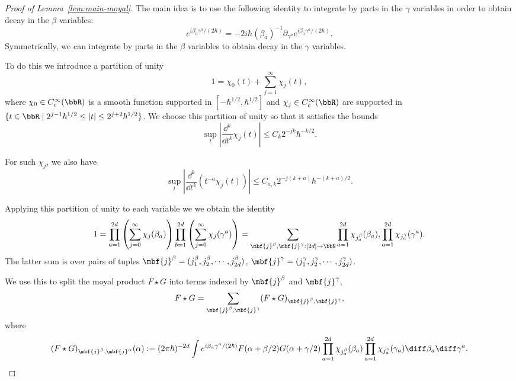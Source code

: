 \documentclass{article}
\numberwithin{equation}{section}
\begin{document}
\begin{proof}[Proof of Lemma~\ref{lem:main-moyal}]
	The main idea is to use the following identity to integrate by parts in the
	$\gamma$ variables in order to obtain decay in the $\beta$ variables:
	\begin{equation}
		\label{eq:int-by-pts}
		e^{i\beta_a\gamma^a/(2\hbar)} =
		-2i\hbar (\beta_a)^{-1} \partial_{\gamma^a} e^{i\beta_a\gamma^a/(2\hbar)}.
	\end{equation}
	Symmetrically, we can integrate by parts in the $\beta$ variables to obtain decay in
	the $\gamma$ variables.
	
	To do this we introduce a partition of unity
	\[
	1 = \chi_0(t) + \sum_{j=1}^\infty \chi_j(t),
	\]
	where $\chi_0\in C_c^\infty(\bbR)$ is a smooth function supported in $[-\hbar^{1/2},\hbar^{1/2}]$
	and $\chi_j\in C_c^\infty(\bbR)$ are supported in $\{t\in\bbR \mid
	2^{j-1}\hbar^{1/2} \leq |t| \leq 2^{j+2} \hbar^{1/2}\}$.  We choose this partition of unity so that it satisfies the bounds
	\begin{equation}
		\label{eq:chi-grad-bds}
		\sup_t \left|\frac{\dd^k}{\dd t^k} \chi_j(t) \right| \leq C_k 2^{-jk} \hbar^{-k/2}.
	\end{equation}
	
	For such $\chi_j$, we also have
	\begin{equation}
		\label{eq:chi-t-bds}
		\sup_t \left|\frac{\dd^k}{\dd t^k} (t^{-a} \chi_j(t)) \right| \leq C_{a,k} 2^{-j(k+a)} \hbar^{-(k+a)/2}.
	\end{equation}
	
	Applying this partition of unity to each variable we we obtain the identity 
	\begin{equation}
		1 = \prod_{a=1}^{2d} \left(\sum_{j=0}^\infty \chi_j(\beta_a)\right)
		\prod_{b=1}^{2d} \left(\sum_{j=0}^\infty \chi_j(\gamma^a)\right)
		= \sum_{\mbf{j}^\beta,\mbf{j}^\gamma:[2d]\to\bbN} \prod_{a=1}^{2d} \chi_{j^\beta_a}(\beta_a),
		\prod_{a=1}^{2d} \chi_{j^\gamma_a}(\gamma^a).
	\end{equation}
	The latter sum is over pairs of tuples
	$\mbf{j}^\beta = (j^\beta_1,j^\beta_2,\cdots,j^\beta_{2d})$,
	$\mbf{j}^\gamma = (j^\gamma_1,j^\gamma_2,\cdots,j^\gamma_{2d})$.
	
	We use this to split the moyal product $F\star G$ into terms indexed by $\mbf{j}^\beta$ and $\mbf{j}^\gamma$,
	\begin{equation}
		\label{eq:j-decomp}
		F\star G = \sum_{\mbf{j}^\beta,\mbf{j}^\gamma} (F\star G)_{\mbf{j}^\beta,\mbf{j}^\gamma},
	\end{equation}
	where
	\begin{equation}
		(F\star G)_{\mbf{j}^\beta,\mbf{j}^\alpha}(\alpha) := (2\pi \hbar)^{-2d}
		\int e^{i \beta_a\gamma^a/(2\hbar)}
		F(\alpha+\beta/2)G(\alpha+\gamma/2)
		\prod_{a=1}^{2d} \chi_{j^\beta_a}(\beta_a)
		\prod_{a=1}^{2d} \chi_{j^\gamma_a}(\gamma_a)
		\diff \beta_a\diff\gamma^a.
	\end{equation}
	

\end{proof}
\end{document}
